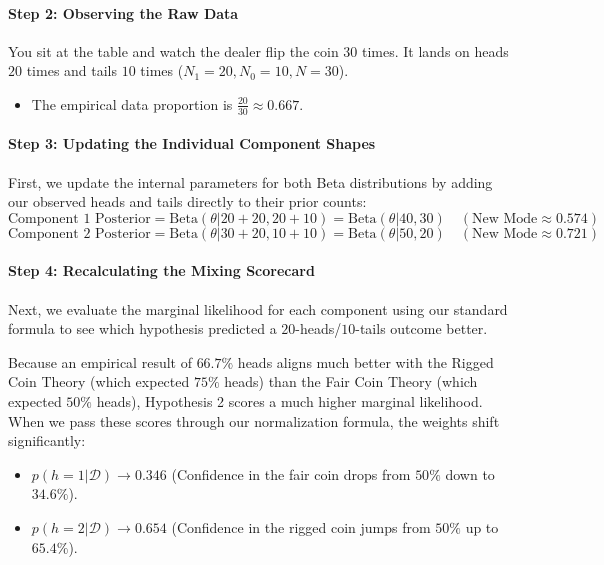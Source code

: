 \documentclass{article}
\begin{document}
\paragraph{Step 2: Observing the Raw Data}
You sit at the table and watch the dealer flip the coin $30$ times. It lands on heads $20$ times and tails $10$ times ($N_1 = 20, N_0 = 10, N = 30$). 
\begin{itemize}
    \item The empirical data proportion is $\frac{20}{30} \approx 0.667$.
\end{itemize}

\paragraph{Step 3: Updating the Individual Component Shapes}
First, we update the internal parameters for both Beta distributions by adding our observed heads and tails directly to their prior counts:
\begin{equation}
\text{Component 1 Posterior} = \text{Beta}(\theta|20+20, 20+10) = \text{Beta}(\theta|40, 30) \quad (\text{New Mode} \approx 0.574)
\end{equation}
\begin{equation}
\text{Component 2 Posterior} = \text{Beta}(\theta|30+20, 10+10) = \text{Beta}(\theta|50, 20) \quad (\text{New Mode} \approx 0.721)
\end{equation}

\paragraph{Step 4: Recalculating the Mixing Scorecard}
Next, we evaluate the marginal likelihood for each component using our standard formula to see which hypothesis predicted a $20$-heads/$10$-tails outcome better. 

Because an empirical result of $66.7\%$ heads aligns much better with the Rigged Coin Theory (which expected $75\%$ heads) than the Fair Coin Theory (which expected $50\%$ heads), Hypothesis 2 scores a much higher marginal likelihood. When we pass these scores through our normalization formula, the weights shift significantly:
\begin{itemize}
    \item $p(h = 1|\mathcal{D}) \to \mathbf{0.346}$ (Confidence in the fair coin drops from $50\%$ down to $34.6\%$).
    \item $p(h = 2|\mathcal{D}) \to \mathbf{0.654}$ (Confidence in the rigged coin jumps from $50\%$ up to $65.4\%$).
\end{itemize}
\end{document}
